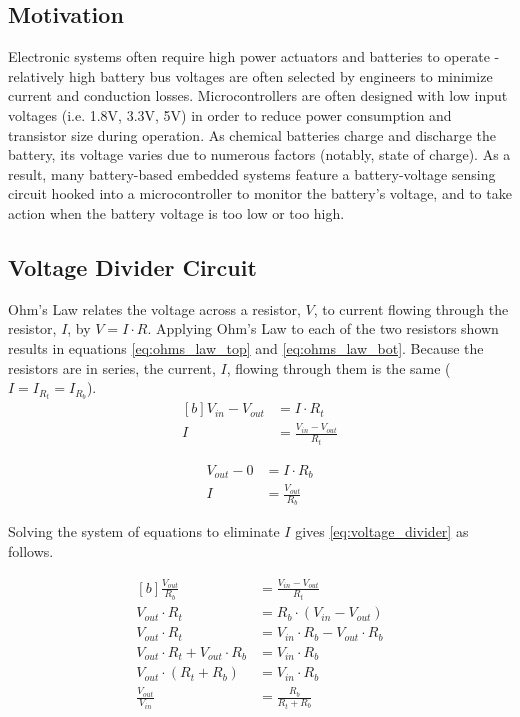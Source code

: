 \documentclass[main.tex]{subfiles}
\begin{document}
\subsection{Motivation}
Electronic systems often require high power actuators and batteries to operate - relatively high battery bus voltages are often selected by engineers to minimize current and conduction losses. Microcontrollers are often designed with low input voltages (i.e. 1.8V, 3.3V, 5V) in order to reduce power consumption and transistor size during operation. As chemical batteries charge and discharge the battery, its voltage varies due to numerous factors (notably, state of charge). As a result, many battery-based embedded systems feature a battery-voltage sensing circuit hooked into a microcontroller to monitor the battery's voltage, and to take action when the battery voltage is too low or too high.

\subsection{Voltage Divider Circuit}
Ohm's Law relates the voltage across a resistor, $V$, to current flowing through the resistor, $I$, by $V = I \cdot R$. Applying Ohm's Law to each of the two resistors shown results in equations \eqref{eq:ohms_law_top} and \eqref{eq:ohms_law_bot}. Because the resistors are in series, the current, $I$, flowing through them is the same ($I = I_{R_t} = I_{R_b}$).
\begin{equation}
    \begin{aligned}[b]
        V_{in} - V_{out} &= I \cdot R_t \\
        I &= \frac{V_{in} - V_{out}}{R_t}
    \end{aligned}
    \label{eq:ohms_law_top}
\end{equation}

\begin{equation}
    \begin{aligned}
        V_{out} - 0 &= I \cdot R_b \\
        I &= \frac{V_{out}}{R_b}
    \end{aligned}
    \label{eq:ohms_law_bot}
\end{equation}

\noindent Solving the system of equations to eliminate $I$ gives \eqref{eq:voltage_divider} as follows. 

\begin{equation}
    \begin{aligned}[b]
        \frac{V_{out}}{R_b} &= \frac{V_{in} - V_{out}}{R_t} \\
        V_{out} \cdot R_t &= R_b \cdot (V_{in} - V_{out}) \\
        V_{out} \cdot R_t &= V_{in} \cdot R_b - V_{out} \cdot R_b \\
        V_{out} \cdot R_t + V_{out} \cdot R_b &= V_{in} \cdot R_b \\
        V_{out} \cdot (R_t + R_b) &= V_{in} \cdot R_b \\
        \frac{V_{out}}{V_{in}} &= \frac{R_b}{R_t + R_b}
    \end{aligned}
    \label{eq:voltage_divider}
\end{equation}
\end{document}

